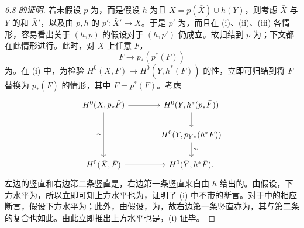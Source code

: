 \begin{proof}[6.8 的证明]
若未假设 $p$ 为，而是假设 $h$ 为且 $X=p(\bar X)\cup h(Y)$，则考虑 $\bar X$ 与 $Y$ 的和 $\bar X'$，以及由 $p,h$ 的 $p':\bar X'\to X$。于是 $p'$ 为，而且在 (i)、(ii)、(iii) 各情形，容易看出关于 $(h,p)$ 的假设对于 $(h,p')$ 仍成立。故归结到 $p$ 为；下文都在此情形进行。此时，对 $X$ 上任意 $F$，
\[
F\longrightarrow p_*(p^*(F))
\]
为。在 (i) 中，为检验 $H^0(X,F)\to H^0(Y,h^*(F))$ 的性，立即可归结到将 $F$ 替换为 $p_*(\bar F)$ 的情形，其中 $\bar F=p^*(F)$。考虑
\[
\begin{tikzcd}[column sep=large]
H^0(X,p_*\bar F)\arrow[r]\arrow[dd,"\sim"']&H^0(Y,h^*(p_*\bar F))\arrow[d]\\
&H^0(Y,p_{Y*}(\bar h^*\bar F))\arrow[d,"\sim"]\\
H^0(\bar X,\bar F)\arrow[r]&H^0(\bar Y,\bar h^*\bar F).
\end{tikzcd}
\]
左边的竖直和右边第二条竖直是，右边第一条竖直来自由 $h$ 给出的。由假设，下方水平为，所以立即可知上方水平也为，证明了 (i) 中不带的断言。对于中的相应断言，假设下方水平为；此外，由假设，为，故右边第一条竖直亦为，其与第二条的复合也如此。由此立即推出上方水平也是，(i) 证毕。


\end{proof}
